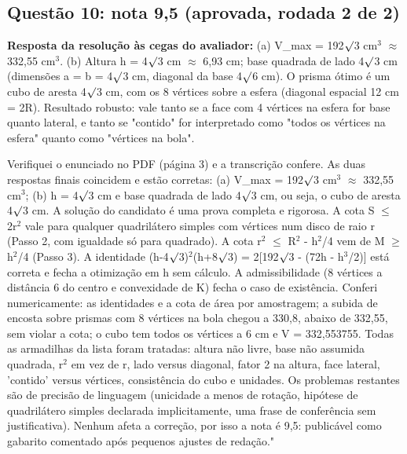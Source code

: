 \documentclass{article}%
\begin{document}
\subsection*{Questão 10: nota 9,5 (aprovada, rodada 2 de 2)}%
\textbf{Resposta da resolução às cegas do avaliador:} (a) V\_max = 192$\surd$3 cm$^3$ $\approx$ 332,55 cm$^3$.\newline%
\newline%
(b) Altura h = 4$\surd$3 cm $\approx$ 6,93 cm; base quadrada de lado 4$\surd$3 cm (dimensões a = b = 4$\surd$3 cm, diagonal da base 4$\surd$6 cm). O prisma ótimo é um cubo de aresta 4$\surd$3 cm, com os 8 vértices sobre a esfera (diagonal espacial 12 cm = 2R).\newline%
\newline%
Resultado robusto: vale tanto se a face com 4 vértices na esfera for base quanto lateral, e tanto se "contido" for interpretado como "todos os vértices na esfera" quanto como "vértices na bola".\par %
Verifiquei o enunciado no PDF (página 3) e a transcrição confere. As duas respostas finais coincidem e estão corretas: (a) V\_max = 192$\surd$3 cm$^3$ $\approx$ 332,55 cm$^3$; (b) h = 4$\surd$3 cm e base quadrada de lado 4$\surd$3 cm, ou seja, o cubo de aresta 4$\surd$3 cm. A solução do candidato é uma prova completa e rigorosa. A cota S $\leq$ 2r$^2$ vale para qualquer quadrilátero simples com vértices num disco de raio r (Passo 2, com igualdade só para quadrado). A cota r$^2$ $\leq$ R$^2$ - h$^2$/4 vem de M $\geq$ h$^2$/4 (Passo 3). A identidade (h-4$\surd$3)$^2$(h+8$\surd$3) = 2{[}192$\surd$3 - (72h - h$^3$/2){]} está correta e fecha a otimização em h sem cálculo. A admissibilidade (8 vértices a distância 6 do centro e convexidade de K) fecha o caso de existência. Conferi numericamente: as identidades e a cota de área por amostragem; a subida de encosta sobre prismas com 8 vértices na bola chegou a 330,8, abaixo de 332,55, sem violar a cota; o cubo tem todos os vértices a 6 cm e V = 332,553755. Todas as armadilhas da lista foram tratadas: altura não livre, base não assumida quadrada, r$^2$ em vez de r, lado versus diagonal, fator 2 na altura, face lateral, 'contido' versus vértices, consistência do cubo e unidades. Os problemas restantes são de precisão de linguagem (unicidade a menos de rotação, hipótese de quadrilátero simples declarada implicitamente, uma frase de conferência sem justificativa). Nenhum afeta a correção, por isso a nota é 9,5: publicável como gabarito comentado após pequenos ajustes de redação."%
\end{document}
